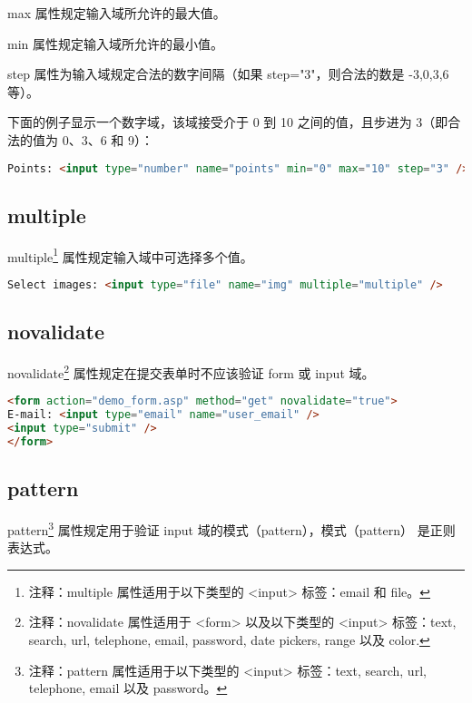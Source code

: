 \begin{compactitem}
\item max 属性规定输入域所允许的最大值。
\item min 属性规定输入域所允许的最小值。
\item step 属性为输入域规定合法的数字间隔（如果 step="3"，则合法的数是 -3,0,3,6 等）。
\end{compactitem}

下面的例子显示一个数字域，该域接受介于 0 到 10 之间的值，且步进为 3（即合法的值为 0、3、6 和 9）：

\begin{lstlisting}[language=HTML]
Points: <input type="number" name="points" min="0" max="10" step="3" />
\end{lstlisting}


\subsection{multiple}

multiple\footnote{注释：multiple 属性适用于以下类型的 <input> 标签：email 和 file。} 属性规定输入域中可选择多个值。


\begin{lstlisting}[language=HTML]
Select images: <input type="file" name="img" multiple="multiple" />
\end{lstlisting}



\subsection{novalidate}


novalidate\footnote{注释：novalidate 属性适用于 <form> 以及以下类型的 <input> 标签：text, search, url, telephone, email, password, date pickers, range 以及 color.} 属性规定在提交表单时不应该验证 form 或 input 域。

\begin{lstlisting}[language=HTML]
<form action="demo_form.asp" method="get" novalidate="true">
E-mail: <input type="email" name="user_email" />
<input type="submit" />
</form>
\end{lstlisting}


\subsection{pattern}

pattern\footnote{注释：pattern 属性适用于以下类型的 <input> 标签：text, search, url, telephone, email 以及 password。} 属性规定用于验证 input 域的模式（pattern），模式（pattern） 是正则表达式。


